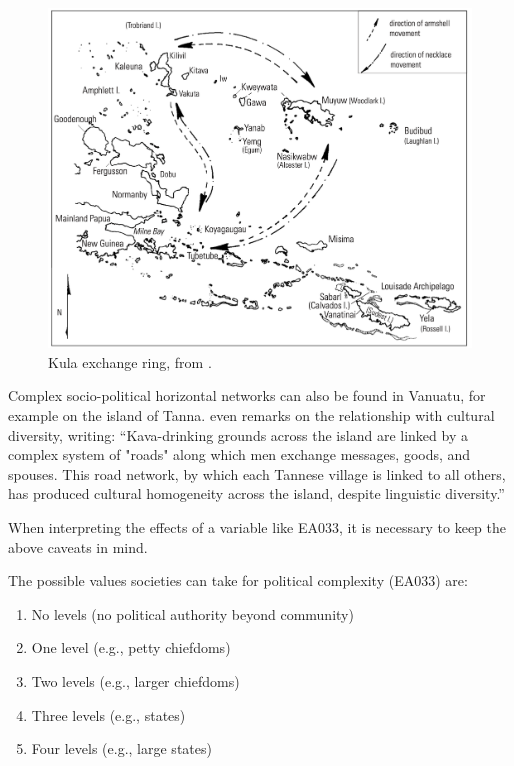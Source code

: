 \documentclass[12pt,letterpaper]{article}
\begin{document}
\begin{figure}[ht]
\centering
\includegraphics[width=\textwidth]{latex/kula_ring_damon}
\caption{Kula exchange ring, from \citet{damon2002kula}.}
\label{appendix_kula_ring}
\end{figure}

Complex socio-political horizontal networks can also be found in Vanuatu, for example on the island of Tanna. \citet[314]{lindstroem1991} even remarks on the relationship with cultural diversity, writing: ``Kava-drinking grounds across the island are linked by a complex system of "roads" along which men exchange messages, goods, and spouses. This road network, by which each Tannese village is linked to all others, has produced cultural homogeneity across the island, despite linguistic diversity.''

When interpreting the effects of a variable like EA033, it is necessary to keep the above caveats in mind.

The possible values societies can take for political complexity (EA033) are:

\begin{enumerate}
\item No levels (no political authority beyond community)
\item One level (e.g., petty chiefdoms)
\item Two levels (e.g., larger chiefdoms)
\item Three levels (e.g., states) 
\item Four levels (e.g., large states)
\end{enumerate}
\end{document}
